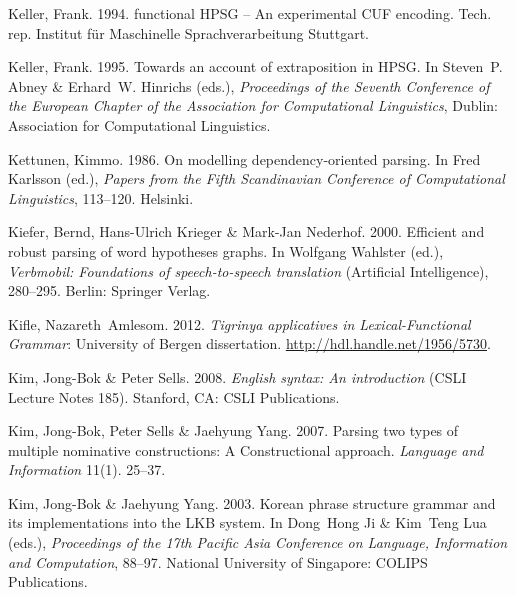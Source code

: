 \begin{thebibliography}{1420}
Keller, Frank. 1994.
 functional {HPSG} -- {An} experimental {CUF} encoding.
\newblock Tech. rep. Institut f{\"u}r Maschinelle Sprachverarbeitung Stuttgart.

Keller, Frank. 1995.
\newblock Towards an account of extraposition in {HPSG}.
\newblock In Steven~P. Abney \& Erhard~W. Hinrichs (eds.), \emph{Proceedings of
  the {Seventh Conference of the European Chapter of the Association for
  Computational Linguistics}}, Dublin: Association for Computational
  Linguistics.

Kettunen, Kimmo. 1986.
\newblock On modelling dependency-oriented parsing.
\newblock In Fred Karlsson (ed.), \emph{Papers from the {Fifth Scandinavian
  Conference of Computational Linguistics}}, 113--120. Helsinki.

Kiefer, Bernd, Hans-Ulrich Krieger \& Mark-Jan Nederhof. 2000.
\newblock Efficient and robust parsing of word hypotheses graphs.
\newblock In Wolfgang Wahlster (ed.), \emph{Verbmobil: {Foundations} of
  speech-to-speech translation}  (Artificial Intelligence), 280--295. Berlin:
  Springer Verlag.

Kifle, Nazareth~Amlesom. 2012.
\newblock \emph{Tigrinya applicatives in {Lexical-Functional Grammar}}:
  University of Bergen dissertation.
\newblock \urlprefix\url{http://hdl.handle.net/1956/5730}.

Kim, Jong-Bok \& Peter Sells. 2008.
\newblock \emph{English syntax: {An} introduction} (CSLI Lecture Notes 185).
\newblock Stanford, CA: CSLI Publications.

Kim, Jong-Bok, Peter Sells \& Jaehyung Yang. 2007.
\newblock Parsing two types of multiple nominative constructions: {A}
  {Constructional} approach.
\newblock \emph{Language and Information} 11(1). 25--37.

Kim, Jong-Bok \& Jaehyung Yang. 2003.
\newblock Korean phrase structure grammar and its implementations into the
  {LKB} system.
\newblock In Dong~Hong Ji \& Kim~Teng Lua (eds.), \emph{Proceedings of the
  {17th Pacific Asia Conference on Language, Information and Computation}},
  88--97. National University of Singapore: COLIPS Publications.


\end{thebibliography}
